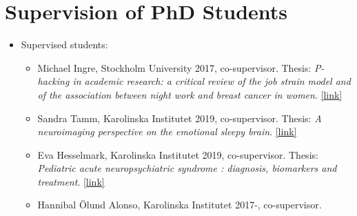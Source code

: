 \documentclass[10pt,a4paper,twocolumn]{article}
\begin{document}

\section{Supervision of PhD Students}
\begin{itemize}
    \item Supervised students:
    \begin{itemize}

        \item Michael Ingre, Stockholm University 2017, co-supervisor. Thesis: \emph{P-hacking in academic research: a critical review of the job strain model and of the association between night work and breast cancer in women}. \href{http://urn.kb.se/resolve?urn=urn:nbn:se:su:diva-141136}{[link]}

        \item Sandra Tamm, Karolinska Institutet 2019, co-supervisor. Thesis: \emph{A neuroimaging perspective on the emotional sleepy brain}. \href{https://openarchive.ki.se/xmlui/handle/10616/46632}{[link]}

        \item Eva Hesselmark, Karolinska Institutet 2019, co-supervisor. Thesis: \emph{Pediatric acute neuropsychiatric syndrome : diagnosis, biomarkers and treatment}. \href{https://openarchive.ki.se/xmlui/handle/10616/46741}{[link]}

        \item Hannibal Ölund Alonso, Karolinska Institutet 2017-, co-supervisor.

    \end{itemize}
\end{itemize}


\end{document}
